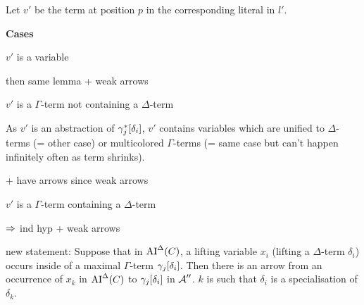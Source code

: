 \documentclass[,%
	paper=a4,%
	DIV12, %
	twoside=false,%
	liststotoc,
	bibtotoc,
	draft=false,%
	numbers=noendperiod
]{scrartcl}
\begin{document}
Let $v'$ be the term at position $p$ in the corresponding literal in $l'$.

\textbf{Cases}
\begin{compactitem}
\item $v'$ is a variable 

	then same lemma + weak arrows

\item $v'$ is a $\Gamma$-term not containing a $\Delta$-term 

	As $v'$ is an abstraction of $\gamma_j^*[\delta_i]$, $v'$ contains variables which are unified to $\Delta$-terms (= other case) or multicolored $\Gamma$-terms (= same case but can't happen infinitely often as term shrinks).

	+ have arrows since weak arrows

\item $v'$ is a $\Gamma$-term containing a $\Delta$-term 

	$\Rightarrow$ ind hyp + weak arrows
\end{compactitem}









new statement:
Suppose that in $\operatorname{AI}^\Delta(C)$, a lifting variable $x_i$ (lifting a $\Delta$-term $\delta_i$)
occurs inside of a maximal $\Gamma$-term $\gamma_j[\delta_i]$.
Then there is an arrow from an occurrence of $x_k$ in $\operatorname{AI}^\Delta(C)$ to $\gamma_j[\delta_i]$ in $\operatorname{\mathcal{A}}''$. $k$ is such that $\delta_i$ is a specialisation of $\delta_k$.
\end{document}
